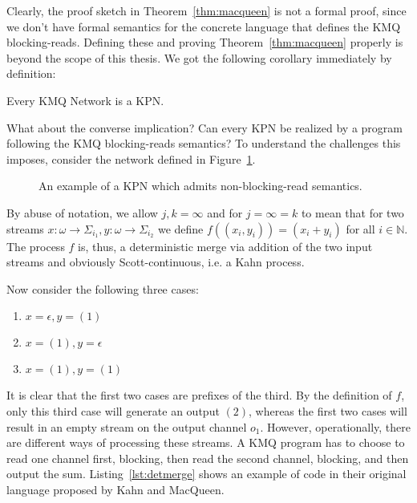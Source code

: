 Clearly, the proof sketch in Theorem~\ref{thm:macqueen} is not a formal proof, since we don't have formal semantics for the concrete language that defines the \ac{KMQ} blocking-reads.
Defining these and proving Theorem~\ref{thm:macqueen} properly is beyond the scope of this thesis.
We got the following corollary immediately by definition:

\begin{cor}
\label{cor:macqueen}
Every \acl{KMQ} Network is a \acl{KPN}.
\end{cor}

What about the converse implication? Can every \ac{KPN} be realized by a program following the \ac{KMQ} blocking-reads semantics?
To understand the challenges this imposes, consider the network defined in Figure~\ref{fig:macqueen_counterexample}.

\begin{figure}[h]
	\centering
   \resizebox{0.85\textwidth}{!}{}
	\caption{An example of a \ac{KPN} which admits non-blocking-read semantics.}
	\label{fig:macqueen_counterexample}
\end{figure}

By abuse of notation, we allow $j, k = \infty$ and for $j = \infty = k$ to mean that for two streams $x : \omega \rightarrow \Sigma_{i_1}, y : \omega \rightarrow \Sigma_{i_2}$ we define $f((x_i,y_i)) = (x_i+y_i)$ for all $i \in \mathbb{N}$.
The process $f$ is, thus, a deterministic merge via addition of the two input streams and obviously Scott-continuous, i.e. a Kahn process.

Now consider the following three cases:
\begin{enumerate}
\item $x = \epsilon, y = (1)$
\item $x = (1), y = \epsilon$
\item $x = (1), y = (1)$
\end{enumerate}

It is clear that the first two cases are prefixes of the third.
By the definition of $f$, only this third case will generate an output $(2)$, whereas the first two cases will result in an empty stream on the output channel $o_1$. 
However, operationally, there are different ways of processing these streams.
A \ac{KMQ} program has to choose to read one channel first, blocking, then read the second channel, blocking, and then output the sum.
Listing~\ref{lst:detmerge} shows an example of code in their original language proposed by Kahn and MacQueen.

